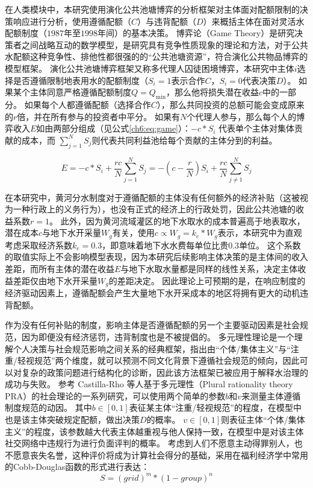 在人类模块中，本研究使用演化公共池塘博弈的分析框架对主体面对配额限制的决策响应进行分析，使用遵循配额（$C$）与违背配额（$D$）来概括主体在面对灵活水配额制度（$1987$年至$1998$年间）的基本决策。
博弈论（Game Theory）是研究决策者之间战略互动的数学模型，是研究具有竞争性质现象的理论和方法，对于公共水配额这种竞争性、排他性都很强的的“公共池塘资源”，符合演化公共物品博弈的模型框架\cite{ostrom2009, traulsen2010}。
演化公共池塘博弈框架又称多代理人囚徒困境博弈，本研究中主体$i$选择是否遵循限制地表用水的配额制度（$S_i = 1$表示合作$C$，$S_i=0$代表决策$D$）。
如果某个主体同意严格遵循配额制度$Q = Q_{\min}$，那么他将损失潜在收益$c$中的一部分。
如果每个人都遵循配额（选择合作$C$），那么共同投资的总额可能会变成原来的$r$倍，并在所有参与的投资者中平分。
如果有$N$个代理人参与，那么每个人的博弈收入$E$如由两部分组成（见公式\ref{ch6:eq:game}）：$-c*S_i$ 代表单个主体对集体贡献的成本，而 $\sum_{j=1}^N S_j$则代表共同利益池给每个贡献的主体分到的利益。

\begin{equation}
    \label{ch6:eq:game}
    E=-c * S_i+\frac{r c}{N} \sum_{j=1}^N S_j=-\left(c-\frac{r}{N}\right) S_i+\frac{r c}{N} \sum_{j \neq 1}^N S_j
\end{equation}

在本研究中，黄河分水制度对于遵循配额的主体没有任何额外的经济补贴（这被视为一种行政上的义务行为），也没有正式的经济上的行政处罚，因此公共池塘的收益系数$r = 1$。
此外，因为黄河流域灌区的地下水取水的成本普遍高于地表取水，潜在成本$c$与地下水开采量$W_g$有关，使用$c \propto W_g = k_e * W_g$表示，本研究中为直观考虑采取经济系数$k_e = 0.3$，即意味着地下水水费每单位比贵$0.3$单位。
这个系数的取值实际上不会影响模型表现，因为本研究后续影响主体决策的是主体间的收入差距，而所有主体的潜在收益$E$与地下水取水量都是同样的线性关系，决定主体收益差距仅由地下水开采量$W_g$的差距决定。
因此理论上可预期的是，在响应制度的经济驱动因素上，遵循配额会产生大量地下水开采成本的地区将拥有更大的动机违背配额。

作为没有任何补贴的制度，影响主体是否遵循配额的另一个主要驱动因素是社会规范，因为即便没有经济惩罚，违背制度也是不被提倡的。
多元理性理论是一个理解个人决策与社会规范影响之间关系的经典框架，指出由“个体/集体主义”与“注重/轻视规范”两个维度，就可以预测不同文化背景下遵循社会规范的倾向\cite{verweij2015}，因此可以对复杂的政策问题进行结构化的诊断，因此该方法框架已被应用于解释水治理的成功与失败。
参考 Castilla-Rho 等人基于多元理性（Plural rationality theory PRA）的社会理论的一系列研究，可以使用两个简单的参数$b$和$v$来测量主体遵循制度规范的动因。
其中$b\in[0, 1]$表征某主体“注重/轻视规范”的程度，在模型中也是该主体突破规定配额，做出决策$D$的概率。
$v \in [0, 1]$则表征主体“个体/集体主义”的程度，该参数越大代表主体越重视与他人保持一致，在模型中是对该主体社交网络中违规行为进行负面评判的概率。
考虑到人们不愿意主动得罪别人，也不愿意丧失名誉，这种评价将成为计算社会得分的基础，采用在福利经济学中常用的Cobb-Douglas函数的形式进行表达：
\begin{equation}
    S = {(grid)}^m * {(1 - group)}^n
    \label{ch6:eq:society}
\end{equation}

